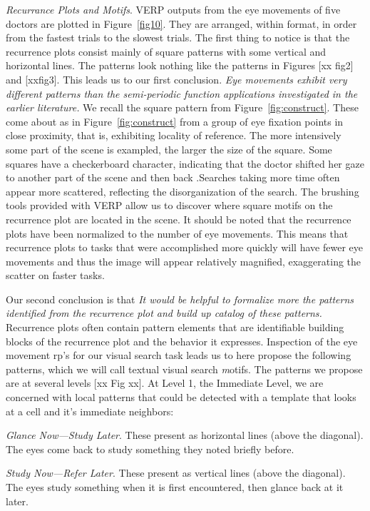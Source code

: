 \documentclass{sigchi}
\begin{document}
\emph{Recurrance Plots and Motifs}. VERP outputs from the eye movements of five doctors are
plotted in Figure~\ref{fig10}. They are arranged, within format, in order from the
fastest trials to the slowest trials. The first thing to notice is that the
recurrence plots consist mainly of square patterns with some vertical and horizontal lines. The patterns look nothing like the patterns in Figures [xx fig2] and [xxfig3]. This leads us to our first conclusion. \emph{Eye movements exhibit very different patterns than the semi-periodic function applications investigated in the earlier literature.} We recall the square
pattern from Figure~\ref{fig:construct}. These come about as in Figure~\ref{fig:construct} 
from a group of eye fixation points in close proximity, that is, exhibiting 
locality of reference. The more intensively some part of the scene is exampled, the
larger the size of the square. Some squares have a checkerboard character,
indicating that the doctor shifted her gaze to another part of the scene
and then back .Searches taking more time often  appear more
scattered, reflecting the disorganization of the search. The brushing 
tools provided with VERP allow us to discover where square motifs on 
the recurrence plot are located in the scene. It should be noted that the recurrence plots have been
normalized to the number of eye movements. This means that recurrence plots
to tasks that were accomplished more quickly will have fewer eye movements
and thus the image will appear relatively magnified, exaggerating the
scatter on faster tasks. 

Our second conclusion is that \emph{It would be helpful to formalize more the patterns identified from the recurrence plot and build up catalog of these patterns.}
Recurrence plots often contain
pattern elements that are identifiable building blocks of the recurrence plot and the behavior it expresses. Inspection of the eye movement rp's for our visual search task leads us to here propose the following patterns,  which we will call textual visual search  {\emph motifs}. The patterns we propose are at several levels [xx Fig xx].
At Level 1, the Immediate Level, we are concerned with local patterns that could be detected with a template that looks at a cell and it's immediate neighbors:

\emph{Glance Now—Study Later}. These present as horizontal lines (above the
diagonal). The eyes come back to study something they noted briefly before.

\emph{Study Now—Refer Later}. These present as vertical lines (above the
diagonal). The eyes study something when it is first encountered, then
glance back at it later.
\end{document}
